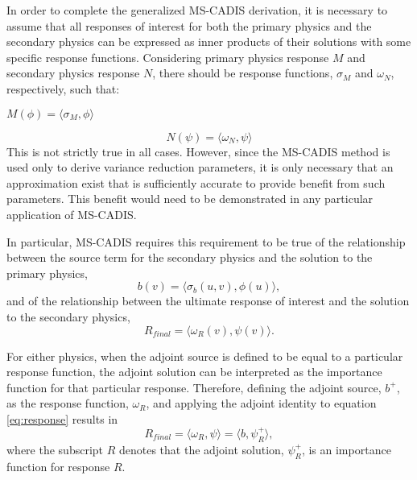 In order to complete the generalized MS-CADIS derivation, it is necessary to
assume that all responses of interest for both the primary physics and the
secondary physics can be expressed as inner products of their solutions with
some specific response functions.  Considering primary physics response $M$
and secondary physics response $N$, there should be response functions,
$\sigma_M$ and $\omega_N$, respectively, such that:
\begin{center}
	{$ M(\phi) = \langle \sigma_M , \phi \rangle$}
\end{center}
\begin{equation}
   N(\psi) = \langle \omega_N , \psi \rangle
\end{equation}
This is not strictly true in all cases.  However, since the
MS-CADIS method is used only to derive variance reduction parameters, it is
only necessary that an approximation exist that is sufficiently accurate to
provide benefit from such parameters.  This benefit would need to be
demonstrated in any particular application of MS-CADIS.

In particular, MS-CADIS requires this requirement to be true of the
relationship between the source term for the secondary physics and the
solution to the primary physics,
\begin{equation}\label{eq:coupling}
  b(v) = \langle \sigma_b(u,v), \phi(u) \rangle,
\end{equation}
and of the relationship between the ultimate response of interest and the
solution to the secondary physics,
\begin{equation} \label{eq:response}
  R_{final} = \langle \omega_R(v), \psi(v) \rangle.
\end{equation}

For either physics, when the adjoint source is defined to be equal to a
particular response function, the adjoint solution can be interpreted as the
importance function for that particular response.  
Therefore, defining the adjoint source, $b^{+}$,
as the response function, $\omega_R$,
and applying the
adjoint identity to equation \ref{eq:response} results in
\begin{equation}
  R_{final} = \langle \omega_R, \psi \rangle = \langle b, \psi_R^{+}\rangle,
\end{equation}
where the subscript $R$ denotes that the adjoint solution, $\psi_R^{+}$, is an
importance function for response $R$.

